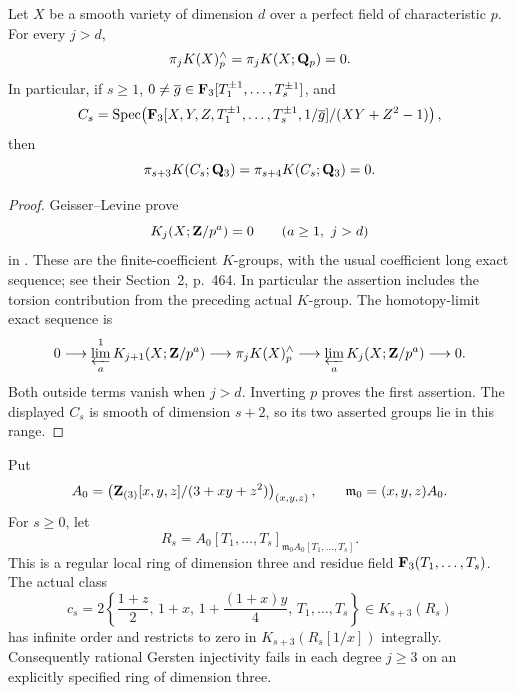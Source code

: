 \begin{lemma}
\label{d3:lem:laurentspecialvanishing}
Let $X$ be a smooth variety of dimension $d$ over a perfect field
of characteristic $p$. For every $j>d$,
\[
 \pi_jK(X)^{\wedge}_p=\pi_jK(X;\mathbf Q_p)=0.
\]
In particular, if $s\geq1$, $0\ne\overline g\in
\mathbf F_3[T_1^{\pm1},\ldots,T_s^{\pm1}]$, and
\[
 C_s=\operatorname{Spec}\!\left(
 \mathbf F_3[X,Y,Z,T_1^{\pm1},\ldots,T_s^{\pm1},1/\overline g]
                         /(XY+Z^2-1)\right),
\]
then
\[
 \pi_{s+3}K(C_s;\mathbf Q_3)=\pi_{s+4}K(C_s;\mathbf Q_3)=0.
\]
\end{lemma}
\begin{proof}
Geisser--Levine prove
\[
 K_j(X;\mathbf Z/p^a)=0\qquad(a\geq1,\ j>d)
\]
in \cite[Theorem~8.4, p.~491]{GeisserLevineCharP}.
These are the finite-coefficient $K$-groups, with the usual
coefficient long exact sequence; see their Section~2, p.~464.
In particular the assertion includes the torsion contribution
from the preceding actual $K$-group.
The homotopy-limit exact sequence is
\[
 0\longrightarrow\varprojlim_a^{1}K_{j+1}(X;\mathbf Z/p^a)
 \longrightarrow\pi_jK(X)^{\wedge}_p
 \longrightarrow\varprojlim_a K_j(X;\mathbf Z/p^a)
 \longrightarrow0.
\]
Both outside terms vanish when $j>d$. Inverting $p$ proves the
first assertion. The displayed $C_s$ is smooth of dimension
$s+2$, so its two asserted groups lie in this range.
\end{proof}


\begin{theorem}
\label{d3:thm:everydegreelaurent}
Put
\[
 A_0=\left(\mathbf Z_{(3)}[x,y,z]/(3+xy+z^2)\right)_{(x,y,z)},
 \qquad \mathfrak m_0=(x,y,z)A_0.
\]
For $s\geq0$, let
\[
 R_s=A_0[T_1,\ldots,T_s]_{\mathfrak m_0A_0[T_1,\ldots,T_s]}.
\]
This is a regular local ring of dimension three and residue field
$\mathbf F_3(T_1,\ldots,T_s)$. The actual class
\[
 c_s=2\left\{\frac{1+z}{2},\,1+x,\,
       1+\frac{(1+x)y}{4},\,T_1,\ldots,T_s\right\}
                    \in K_{s+3}(R_s)
\]
has infinite order and restricts to zero in $K_{s+3}(R_s[1/x])$
integrally. Consequently rational Gersten injectivity fails in
each degree $j\geq3$ on an explicitly specified ring of dimension
three.
\end{theorem}

